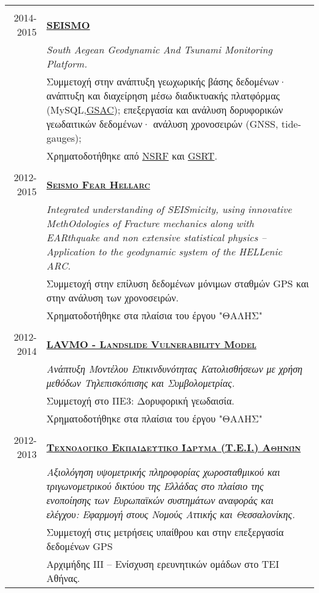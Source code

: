 \documentclass[a4paper,10pt]{article} %
\begin{document}
\begin{longtable}{r|p{13cm}}
\multicolumn{2}{c}{} \\
\textsc{2014-2015} & \textbf{\textsc{\href{http://dionysos.survey.ntua.gr/SEISMO/index.html}{SEISMO}}}\\
  & \textit{South Aegean Geodynamic And Tsunami Monitoring Platform.}\\
  & Συμμετοχή στην ανάπτυξη γεωχωρικής βάσης δεδομένων· ανάπτυξη και διαχείρηση μέσω διαδικτυακής πλατφόρμας (MySQL,\href{http://www.unavco.org/software/data-management/gsac/gsac.html}{GSAC});
    επεξεργασία και ανάλυση δορυφορικών γεωδαιτικών δεδομένων· ανάλυση χρονοσειρών (GNSS, tide-gauges); \\
  & Χρηματοδοτήθηκε από \href{http://www.espa.gr/en/Pages/Default.aspx}{NSRF} και \href{http://www.gsrt.gr/central.aspx?sId=119I428I1089I323I488743}{GSRT}.\\

\multicolumn{2}{c}{} \\
\textsc{2012-2015} & \textbf{\textsc{\href{http://excellence.minedu.gov.gr/thales/en/thalesprojects/380208}{Seismo Fear Hellarc}}}\\
  & \textit{Integrated understanding of SEISmicity, using innovative MethOdologies of Fracture mechanics along with EARthquake and non extensive statistical physics – Application to the geodynamic system of the HELLenic ARC.}\\
  & Συμμετοχή στην επίλυση δεδομένων μόνιμων σταθμών GPS και στην ανάλυση των χρονοσειρών.\\
  & Χρηματοδοτήθηκε στα πλαίσια του έργου "ΘΑΛΗΣ"\\

\multicolumn{2}{c}{} \\ 
\textsc{2012-2014} & \textbf{\textsc{\href{http://excellence.minedu.gov.gr/thales/en/thalesprojects/379347}{LAVMO - Landslide Vulnerability Model}}}\\
  & \textit{Ανάπτυξη Μοντέλου Επικινδυνότητας Κατολισθήσεων με χρήση μεθόδων Τηλεπισκόπισης και Συμβολομετρίας.}\\
  & Συμμετοχή στο ΠΕ3: Δορυφορική γεωδαισία.\\
  & Χρηματοδοτήθηκε στα πλαίσια του έργου "ΘΑΛΗΣ"\\

\multicolumn{2}{c}{} \\
\textsc{2012-2013} & \textbf{\textsc{\href{http://www.teiath.gr/?lang=en}{Τεχνολογικό Εκπαιδευτικό Ίδρυμα (Τ.Ε.Ι.) Αθηνών}}}\\
  & \textit{Αξιολόγηση υψομετρικής πληροφορίας χωροσταθμικού και τριγωνομετρικού δικτύου της Ελλάδας στο πλαίσιο της ενοποίησης των Ευρωπαϊκών συστημάτων αναφοράς και ελέγχου: Εφαρμογή στους Νομούς Αττικής και Θεσσαλονίκης.}\\
  & Συμμετοχή στις μετρήσεις υπαίθρου και στην επεξεργασία δεδομένων GPS\\
  & Αρχιμήδης ΙΙΙ – Ενίσχυση ερευνητικών ομάδων στο ΤΕΙ Αθήνας.\\


\end{longtable}
\end{document}
